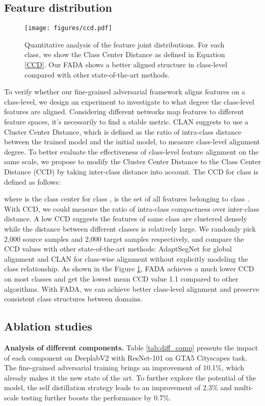 \documentclass[runningheads]{llncs}
\begin{document}
\subsection{Feature distribution}
\label{sec:analysis}
\begin{figure}[t]
	\begin{center}
		\texttt{[image: figures/ccd.pdf]}
	\end{center}
	\caption{Quantitative analysis of the feature joint distributions. For each class, we show the Class Center Distance as defined in Equation \ref{CCD}. Our FADA shows a better aligned structure in class-level compared with other state-of-the-art methods.}
	\label{fig:ccd}
\end{figure}
To verify whether our fine-grained adversarial framework aligns features on a class-level, we design an experiment to investigate to what degree the class-level features are aligned. Considering different networks map features to different feature spaces, it's necessarily to find a stable metric. CLAN \cite{Yawei2019Taking} suggests to use a Cluster Center Distance, which is defined as the ratio of intra-class distance between the trained model and the initial model, to measure class-level alignment degree. To better evaluate the effectiveness of class-level feature alignment on the same scale, we propose to modify the Cluster Center Distance to the Class Center Distance (CCD) by taking inter-class distance into account. The CCD for class  is defined as follows:

where  is the class center for class ,  is the set of all features belonging to class . With CCD, we could measure the ratio of intra-class compactness over inter-class distance. A low CCD suggests the features of same class are clustered densely while the distance between different classes is relatively large. We randomly pick 2,000 source samples and 2,000 target samples respectively, and compare the CCD values with other state-of-the-art methods: AdaptSegNet for global alignment and CLAN for class-wise alignment without explicitly modeling the class relationship. As shown in the Figure \ref{fig:ccd}, FADA achieves a much lower CCD on most classes and get the lowest mean CCD value 1.1 compared to other algorithms. With FADA, we can achieve better class-level alignment and preserve consistent class structures between domains.

\subsection{Ablation studies}
\noindent\textbf{Analysis of different components.}\quad
Table \ref{tab:diff_comp} presents the impact of each component on DeeplabV2 with ResNet-101 on GTA5  Cityscapes task. The fine-grained adversarial training brings an improvement of 10.1\%, which already makes it the new state of the art. To further explore the potential of the model, the self distillation strategy leads to an improvement of 2.3\% and multi-scale testing further boosts the performance by 0.7\%. 
\end{document}

